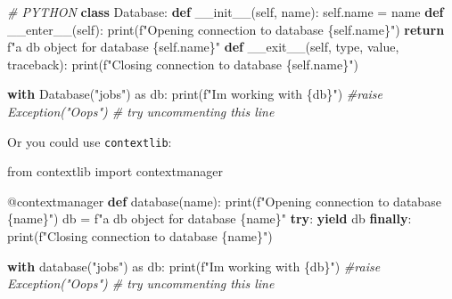\documentclass[11pt]{article}
\newenvironment{Shaded}{}{}
\newcommand{\KeywordTok}[1]{\textcolor[rgb]{0.00,0.44,0.13}{\textbf{{#1}}}}
\newcommand{\StringTok}[1]{\textcolor[rgb]{0.25,0.44,0.63}{{#1}}}
\newcommand{\CommentTok}[1]{\textcolor[rgb]{0.38,0.63,0.69}{\textit{{#1}}}}
\newcommand{\FunctionTok}[1]{\textcolor[rgb]{0.02,0.16,0.49}{{#1}}}
\newcommand{\NormalTok}[1]{{#1}}
\newcommand{\SpecialCharTok}[1]{\textcolor[rgb]{0.25,0.44,0.63}{{#1}}}
\newcommand{\SpecialStringTok}[1]{\textcolor[rgb]{0.73,0.40,0.53}{{#1}}}
\newcommand{\ImportTok}[1]{{#1}}
\newcommand{\VariableTok}[1]{\textcolor[rgb]{0.10,0.09,0.49}{{#1}}}
\newcommand{\ControlFlowTok}[1]{\textcolor[rgb]{0.00,0.44,0.13}{\textbf{{#1}}}}
\newcommand{\OperatorTok}[1]{\textcolor[rgb]{0.40,0.40,0.40}{{#1}}}
\newcommand{\BuiltInTok}[1]{{#1}}
\newcommand{\AttributeTok}[1]{\textcolor[rgb]{0.49,0.56,0.16}{{#1}}}
\begin{document}
    \begin{Shaded}
\begin{Highlighting}[]
\CommentTok{\# PYTHON}
\KeywordTok{class}\NormalTok{ Database:}
    \KeywordTok{def} \FunctionTok{\_\_init\_\_}\NormalTok{(}\VariableTok{self}\NormalTok{, name):}
        \VariableTok{self}\NormalTok{.name }\OperatorTok{=}\NormalTok{ name}
    \KeywordTok{def} \FunctionTok{\_\_enter\_\_}\NormalTok{(}\VariableTok{self}\NormalTok{):}
        \BuiltInTok{print}\NormalTok{(}\SpecialStringTok{f"Opening connection to database }\SpecialCharTok{\{}\VariableTok{self}\SpecialCharTok{.}\NormalTok{name}\SpecialCharTok{\}}\SpecialStringTok{"}\NormalTok{)}
        \ControlFlowTok{return} \SpecialStringTok{f"a db object for database }\SpecialCharTok{\{}\VariableTok{self}\SpecialCharTok{.}\NormalTok{name}\SpecialCharTok{\}}\SpecialStringTok{"}
    \KeywordTok{def} \FunctionTok{\_\_exit\_\_}\NormalTok{(}\VariableTok{self}\NormalTok{, }\BuiltInTok{type}\NormalTok{, value, traceback):}
        \BuiltInTok{print}\NormalTok{(}\SpecialStringTok{f"Closing connection to database }\SpecialCharTok{\{}\VariableTok{self}\SpecialCharTok{.}\NormalTok{name}\SpecialCharTok{\}}\SpecialStringTok{"}\NormalTok{)}

\ControlFlowTok{with}\NormalTok{ Database(}\StringTok{"jobs"}\NormalTok{) }\ImportTok{as}\NormalTok{ db:}
    \BuiltInTok{print}\NormalTok{(}\SpecialStringTok{f"I\textquotesingle{}m working with }\SpecialCharTok{\{db\}}\SpecialStringTok{"}\NormalTok{)}
    \CommentTok{\#raise Exception("Oops") \# try uncommenting this line}
\end{Highlighting}
\end{Shaded}

Or you could use \texttt{contextlib}:

\begin{Shaded}
\begin{Highlighting}[]
\ImportTok{from}\NormalTok{ contextlib }\ImportTok{import}\NormalTok{ contextmanager}

\AttributeTok{@contextmanager}
\KeywordTok{def}\NormalTok{ database(name):}
    \BuiltInTok{print}\NormalTok{(}\SpecialStringTok{f"Opening connection to database }\SpecialCharTok{\{}\NormalTok{name}\SpecialCharTok{\}}\SpecialStringTok{"}\NormalTok{)}
\NormalTok{    db }\OperatorTok{=} \SpecialStringTok{f"a db object for database }\SpecialCharTok{\{}\NormalTok{name}\SpecialCharTok{\}}\SpecialStringTok{"}
    \ControlFlowTok{try}\NormalTok{:}
        \ControlFlowTok{yield}\NormalTok{ db}
    \ControlFlowTok{finally}\NormalTok{:}
        \BuiltInTok{print}\NormalTok{(}\SpecialStringTok{f"Closing connection to database }\SpecialCharTok{\{}\NormalTok{name}\SpecialCharTok{\}}\SpecialStringTok{"}\NormalTok{)}

\ControlFlowTok{with}\NormalTok{ database(}\StringTok{"jobs"}\NormalTok{) }\ImportTok{as}\NormalTok{ db:}
    \BuiltInTok{print}\NormalTok{(}\SpecialStringTok{f"I\textquotesingle{}m working with }\SpecialCharTok{\{db\}}\SpecialStringTok{"}\NormalTok{)}
    \CommentTok{\#raise Exception("Oops") \# try uncommenting this line}
\end{Highlighting}
\end{Shaded}
\end{document}
